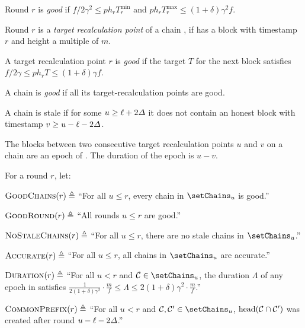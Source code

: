 \begin{definition}
    \begin{cccItemize}[nosep]
        \item Round $r$ is \emph{good} if $f / 2\gamma^2 \le p h_r T^{\min}_r$ and $p h_r T^{\max}_r \le (1 + \delta) \gamma^2 f$.

        \item Round $r$ is a \emph{target recalculation point} of a chain \chain, if \chain has a block with timestamp $r$ and height a multiple of $m$.

        \item A target recalculation point $r$ is \emph{good} if the target $T$ for the next block satisfies $f /2\gamma \le ph_r T \le (1 + \delta)\gamma f$.

        \item A chain is \emph{good} if all its target-recalculation points are good.

        \item A chain is stale if for some $u \ge \ell + 2\varDelta$ it does not contain an honest block with timestamp $v \ge u - \ell - 2\varDelta$.

        \item The blocks between two consecutive target recalculation points $u$ and $v$ on a chain \chain are an epoch of \chain. The duration of the epoch is $u - v$.
    \end{cccItemize}
\end{definition}

\begin{definition} \label{def:security-predicate}
    For a round $r$, let:
    \begin{cccItemize}[nosep]
        \item $\textsc{GoodChains}(r) \triangleq$ ``For all $u \le r$, every chain in $\setChains_u$ is good.''

        \item $\textsc{GoodRound}(r) \triangleq$ ``All rounds $u \le r$ are good.''

        \item $\textsc{NoStaleChains}(r) \triangleq$ ``For all $u \le r$, there are no stale chains in $\setChains_u$.''

        \item $\textsc{Accurate}(r) \triangleq$ ``For all $u \le r$,  all chains in $\setChains_u$ are accurate.''

        \item $\textsc{Duration}(r) \triangleq$ ``For all $u < r$ and $\chain \in \setChains_u$, the duration $\varLambda$ of any epoch in \chain satisfies $\frac{1}{2(1 + \delta)\gamma^2} \cdot \frac{m}{f} \le \varLambda \le 2(1 + \delta)\gamma^2 \cdot \frac{m}{f}$.''

        \item $\textsc{CommonPrefix}(r) \triangleq$ ``For all $u < r$ and $\chain, \chain' \in \setChains_u$, $\mathrm{head}(\mathcal{C} \cap \mathcal{C}')$ was created after round $u - \ell - 2\varDelta$.''
    \end{cccItemize}
\end{definition}

